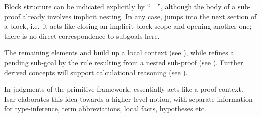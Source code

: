 \begin{isabellebody}
\begin{isamarkuptext}
  \medskip Block structure can be indicated explicitly by
  ``\hyperlink{command.braceleft}{\mbox{\isa{\isacommand{{\isacharbraceleft}}}}}~\isa{{\isachardoublequote}{\isasymdots}{\isachardoublequote}}~\hyperlink{command.braceright}{\mbox{\isa{\isacommand{{\isacharbraceright}}}}}'', although the body of
  a sub-proof already involves implicit nesting.  In any case,
  \hyperlink{command.next}{\mbox{}} jumps into the next section of a block, i.e.\ it
  acts like closing an implicit block scope and opening another one;
  there is no direct correspondence to subgoals here.

  The remaining elements \hyperlink{command.fix}{\mbox{}} and \isa{{\isachardoublequote}{\isasymASSM}{\isachardoublequote}} build
  up a local context (see ), while
  \hyperlink{command.show}{\mbox{}} refines a pending sub-goal by the rule resulting
  from a nested sub-proof (see ).
  Further derived concepts will support calculational reasoning (see
  ).%
\end{isamarkuptext}%
\isamarkuptrue%
%
\isamarkuptrue%
%
\begin{isamarkuptext}%
In judgments \isa{{\isachardoublequote}{\isasymGamma}\ {\isasymturnstile}\ {\isasymphi}{\isachardoublequote}} of the primitive framework, \isa{{\isachardoublequote}{\isasymGamma}{\isachardoublequote}}
  essentially acts like a proof context.  Isar elaborates this idea
  towards a higher-level notion, with separate information for
  type-inference, term abbreviations, local facts, hypotheses etc.


\end{isamarkuptext}
\end{isabellebody}
